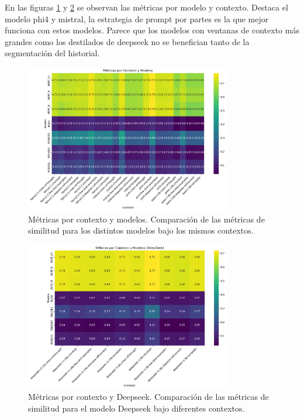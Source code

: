 \documentclass[../main.tex]{subfiles}
\begin{document}
En las figuras \ref{fig:metricas_por_contexto_modelos} y  \ref{fig:metricas_por_contexto_deepseek} se observan las métricas por modelo y contexto. Destaca el modelo phi4 y mistral, la estrategia de prompt por partes es la que mejor funciona con estos modelos. Parece que los modelos con ventanas de contexto más grandes como los destilados de deepseek no se benefician tanto de la segmentación del historial.

\begin{figure}[H]
    \centering
    \includegraphics[width=0.8\textwidth]{images/metricas_por_contexto_modelos.png}
    \caption{Métricas por contexto y modelos. Comparación de las métricas de similitud para los distintos modelos bajo los mismos contextos.}
    \label{fig:metricas_por_contexto_modelos}
\end{figure}

\begin{figure}[H]
    \centering
    \includegraphics[width=0.8\textwidth]{images/metricas_por_contexto_deepseek.png}
    \caption{Métricas por contexto y Deepseek. Comparación de las métricas de similitud para el modelo Deepseek bajo diferentes contextos.}
    \label{fig:metricas_por_contexto_deepseek}
\end{figure}
\end{document}
